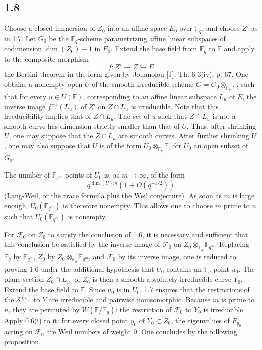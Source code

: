 \documentclass[10pt]{article}
\newcommand{\F}{\mathbb{F}}
\begin{document}
\subsection*{1.8}
Choose a closed immersion of $Z_0$ into an affine space $E_0$ over $\F_q$, and choose $Z'$ as in 1.7.
Let $G_0$ be the $\F_q$-scheme parametrizing affine linear subspaces of codimension $\dim(Z_0)-1$ in $E_0$.
Extend the base field from $\F_q$ to $\F$ and apply to the composite morphism
\[
 f:Z'\to Z\hookrightarrow E
\]
the Bertini theorem in the form given by Jouanolou [J], Th. 6.3(iv), p. 67.
One obtains a nonempty open $U$ of the smooth irreducible scheme $G=G_0\otimes_{\F_q}\F$, such that for every $u\in U(\F)$, corresponding to an affine linear subspace $L_u$ of $E$, the inverse image $f^{-1}(L_u)$ of $Z'$ on $Z\cap L_u$ is irreducible.
Note that this irreducibility implies that of $Z\cap L_u$.
The set of $u$ such that $Z\cap L_u$ is not a smooth curve has dimension strictly smaller than that of $U$.
Thus, after shrinking $U$, one may suppose that the $Z\cap L_u$ are smooth curves.
After further shrinking $U$, one may also suppose that $U$ is of the form $U_0\otimes_{\F_q}\F$, for $U_0$ an open subset of $G_0$.

The number of $\F_{q^m}$-points of $U_0$ is, as $m\to\infty$, of the form
\[
 q^{\dim(U)m}\left(1+O(q^{-1/2})\right)
\]
(Lang-Weil, or the trace formula plus the Weil conjecture).
As soon as $m$ is large enough, $U_0(\F_{q^m})$ is therefore nonempty.
This allows one to choose $m$ prime to $n$ such that $U_0(\F_{q^m})$ is nonempty.

For $\mathcal F_0$ on $Z_0$ to satisfy the conclusion of 1.6, it is necessary and sufficient that this conclusion be satisfied by the inverse image of $\mathcal F_0$ on $Z_0\otimes_{\F_q}\F_{q^m}$.
Replacing $\F_q$ by $\F_{q^m}$, $Z_0$ by $Z_0\otimes_{\F_q}\F_{q^m}$, and $\mathcal F_0$ by its inverse image, one is reduced to proving 1.6 under the additional hypothesis that $U_0$ contains an $\F_q$-point $u_0$.
The plane section $Z_0\cap L_{u_0}$ of $Z_0$ is then a smooth absolutely irreducible curve $Y_0$.
Extend the base field to $\F$.
Since $u_0$ is in $U_0$, 1.7 ensures that the restrictions of the $\mathcal S^{(i)}$ to $Y$ are irreducible and pairwise nonisomorphic.
Because $m$ is prime to $n$, they are permuted by $W(\F/\F_q)$: the restriction of $\mathcal F_0$ to $Y_0$ is irreducible.
Apply 0.6(i) to it: for every closed point $y_0$ of $Y_0\subset Z_0$, the eigenvalues of $F_{y_0}$ acting on $\mathcal F_0$ are Weil numbers of weight $0$.
One concludes by the following proposition.
\end{document}
